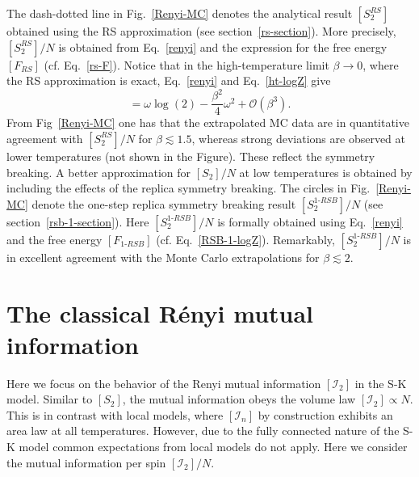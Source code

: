 \documentclass[twocolumn,superscriptaddress,prb,10pt]{revtex4-1}
\begin{document}
The dash-dotted line in Fig.~\ref{Renyi-MC} denotes the analytical result $[S_2^{RS}]$ 
obtained using the RS approximation (see section~\ref{rs-section}). More precisely, 
$[S_2^{RS}]/N$ is obtained from Eq.~\eqref{renyi} and the expression for the free energy 
$[F_{RS}]$ (cf. Eq.~\eqref{rs-F}). Notice that in the 
high-temperature limit $\beta\to0$, where the RS approximation is exact, 
Eq.~\eqref{renyi} and Eq.~\eqref{ht-logZ} give 
%
\begin{equation}
[S^{RS}_2]=\omega\log(2)-\frac{\beta^2}{4}\omega^2+{\mathcal O}(\beta^3).
\end{equation}
%
From Fig~\ref{Renyi-MC} one has that the extrapolated MC data are in quantitative 
agreement with $[S_2^{RS}]/N$ for $\beta\lesssim 1.5$, whereas strong deviations are 
observed at lower temperatures (not shown in the Figure). These reflect the symmetry 
breaking. A better approximation for $[S_2]/N$ at low temperatures is obtained by 
including the effects of the replica symmetry breaking. The circles in Fig.~\ref{Renyi-MC} 
denote the one-step replica symmetry breaking result $[S_2^{1\textrm{-}RSB}]/N$
(see section~\ref{rsb-1-section}). Here $[S_2^{1\textrm{-}RSB}]/N$ is formally obtained 
using Eq.~\eqref{renyi} and the free energy $[F_{1\textrm{-}RSB}]$ (cf. 
Eq.~\eqref{RSB-1-logZ}). Remarkably, $[S_2^{1\textrm{-}RSB}]/N$ is in excellent 
agreement with the Monte Carlo extrapolations for $\beta\lesssim 2$. 


\section{The classical R\'enyi mutual information}
\label{I2-section}

Here we focus on the behavior of the Renyi mutual information $[{\mathcal I}_2]$ in 
the S-K model. Similar to $[S_2]$, the mutual information obeys the volume 
law $[{\mathcal I}_2]\propto N$. This is in contrast with local models, where 
$[{\mathcal I}_n]$ by construction exhibits an area law at all temperatures.
However, due to the fully connected nature of the S-K model common expectations 
from local models do not apply.  Here we consider the mutual information per spin 
$[{\mathcal I}_2]/N$. 
\end{document}
